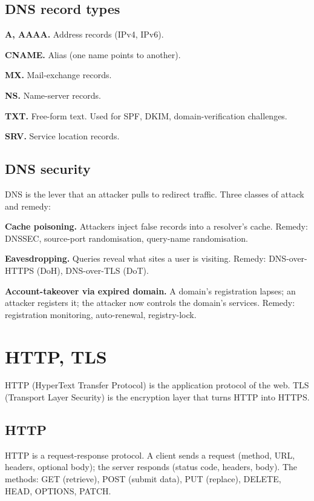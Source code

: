 \subsection{DNS record types}

\textbf{A, AAAA.} Address records (IPv4, IPv6).

\textbf{CNAME.} Alias (one name points to another).

\textbf{MX.} Mail-exchange records.

\textbf{NS.} Name-server records.

\textbf{TXT.} Free-form text. Used for SPF, DKIM, domain-verification challenges.

\textbf{SRV.} Service location records.

\subsection{DNS security}

DNS is the lever that an attacker pulls to redirect traffic. Three classes of attack and remedy:

\textbf{Cache poisoning.} Attackers inject false records into a resolver's cache. Remedy: DNSSEC, source-port randomisation, query-name randomisation.

\textbf{Eavesdropping.} Queries reveal what sites a user is visiting. Remedy: DNS-over-HTTPS (DoH), DNS-over-TLS (DoT).

\textbf{Account-takeover via expired domain.} A domain's registration lapses; an attacker registers it; the attacker now controls the domain's services. Remedy: registration monitoring, auto-renewal, registry-lock.

\section{HTTP, TLS}

HTTP (HyperText Transfer Protocol) is the application protocol of the web. TLS (Transport Layer Security) is the encryption layer that turns HTTP into HTTPS.

\subsection{HTTP}

HTTP is a request-response protocol. A client sends a request (method, URL, headers, optional body); the server responds (status code, headers, body). The methods: GET (retrieve), POST (submit data), PUT (replace), DELETE, HEAD, OPTIONS, PATCH.

